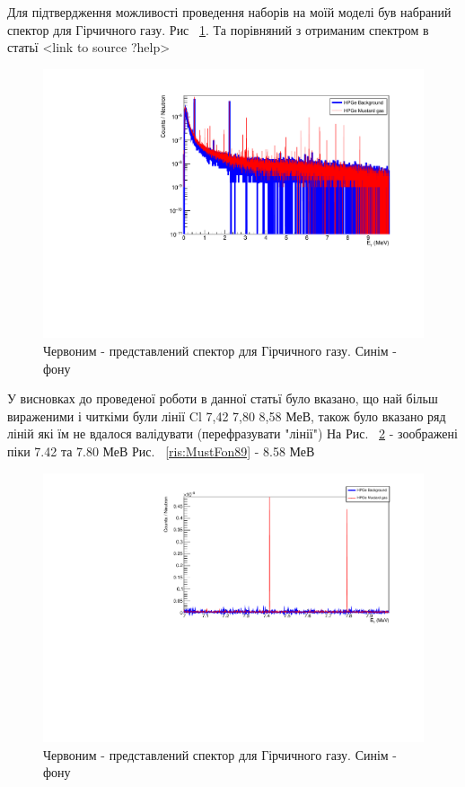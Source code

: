 \documentclass[a4paper, 14pt]{article}
\numberwithin{equation}{section}
\numberwithin{table}{section}
\begin{document}
	Для підтвердження можливості проведення наборів на моїй моделі був набраний спектор для Гірчичного газу. Рис ~\ref{ris:MustBackAllLogSm}. Та порівняний з отриманим спектром в статьї <link to source ?help> 	
	\begin{figure}[h!]
		\centering \includegraphics[width=1\textwidth]{res/smMustFonAll.pdf}
		\caption{Червоним - представлений спектор для Гірчичного газу. Синім - фону} 
		\label{ris:MustBackAllLogSm}	
	\end{figure} 
	У висновках до проведеної роботи в данної статьї було вказано, що най більш вираженими і читкіми були лінії Cl 7,42 7,80 8,58 МеВ, також було вказано ряд ліній які їм не вдалося валідувати (перефразувати "лінії") 
	На Рис. ~\ref{ris:MustFon78} - зоображені піки 7.42 та 7.80 МеВ
	Рис.  ~\ref{ris:MustFon89} - 8.58 МеВ	
	\begin{figure}[hbt!]
		\centering \includegraphics[width=1\textwidth]{res/mustFon78.pdf}
		\caption{Червоним - представлений спектор для Гірчичного газу. Синім - фону} 
		\label{ris:MustFon78}	
	\end{figure} 	
\end{document}
